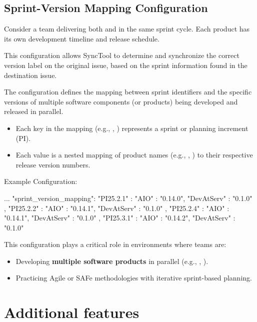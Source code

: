 \subsection{Sprint-Version Mapping Configuration}

Consider a team delivering both  and  in the same
sprint cycle.
Each product has its own development timeline and release schedule.

This configuration allows SyncTool to determine and synchronize the correct
version label on the original issue, based on the sprint information found in
the destination issue.

The  configuration defines the mapping between
sprint identifiers and the specific versions of multiple software components
(or products) being developed and released in parallel.
\begin{itemize}
  \item Each key in the mapping (e.g., , )
        represents a sprint or planning increment (PI).
  \item Each value is a nested mapping of product names (e.g., ,
        ) to their respective release version numbers.
\end{itemize}

Example Configuration:
\begin{pythoncode}
{
   ...
   "sprint_version_mapping": {
      "PI25.2.1" : {
         "AIO" : "0.14.0",
         "DevAtServ" : "0.1.0"
      },
      "PI25.2.2" : {
         "AIO" : "0.14.1",
         "DevAtServ" : "0.1.0"
      },
      "PI25.2.4" : {
         "AIO" : "0.14.1",
         "DevAtServ" : "0.1.0"
      },
      "PI25.3.1" : {
         "AIO" : "0.14.2",
         "DevAtServ" : "0.1.0"
      }
   }
}
\end{pythoncode}

This configuration plays a critical role in environments where teams are:
\begin{itemize}
  \item Developing \textbf{multiple software products} in parallel
        (e.g., , ).
  \item Practicing Agile or SAFe methodologies with iterative sprint-based
        planning.
\end{itemize}

\hypertarget{additional-features}{%
\section{Additional features}\label{additional-features}}

